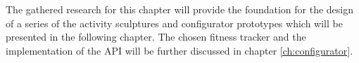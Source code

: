 \documentclass[../medieninformatik-arbeit.tex]{subfiles}
\begin{document}
The gathered research for this chapter will provide the foundation for the design of a series of the activity sculptures and configurator prototypes which will be presented in the following chapter. The chosen fitness tracker and the implementation of the API will be further discussed in chapter \ref{ch:configurator}.
\end{document}
